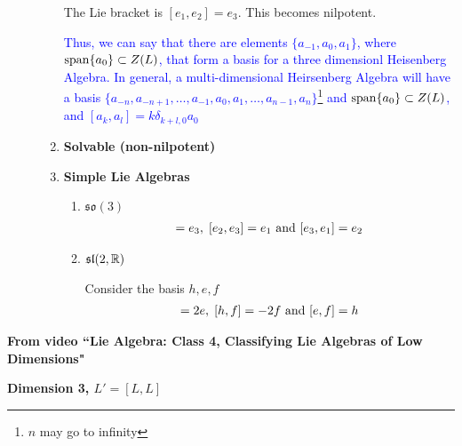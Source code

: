 \documentclass[12pt,a4paper]{report}
\newcommand{\BLUE}[1]{\textcolor{blue}{#1}}
\begin{document}
\begin{description}
\begin{enumerate}
		The Lie bracket is $[e_1, e_2] = e_3$.  This becomes nilpotent.
		
		\BLUE{Thus, we can say that there are elements $\{a_{-1}, a_0, a_1\}$, where $\operatorname{span}\{a_0\} \subset Z(L)$, that form a basis for a three dimensionl Heisenberg Algebra.  In general, a multi-dimensional Heirsenberg Algebra will have a basis $\{a_{-n},a_{-n+1}, \dots, a_{-1},a_0, a_1, \dots, a_{n-1}, a_n\}$\footnote{$n$ may go to infinity} and $\operatorname{span}\{a_0\} \subset Z(L)$, and $[a_k, a_l] = k\delta_{k+l,0}a_0$
		}
		
		\item \textbf{Solvable (non-nilpotent)}	
	
	
		\item \textbf{Simple Lie Algebras}
		
		\begin{enumerate}
			\item $\mathfrak{so}(3)$
				\begin{align*}
					[e_1, e_2] = e_3, \; [e_2, e_3] = e_1 \AND [e_3, e_1]=e_2
				\end{align*}
			\item $\mathfrak{sl}(2, \mathbb{R})$
			
			Consider the basis $h, e, f$
			\begin{align*}
				[h,e] = 2e,\;[h,f]=-2f \AND [e,f]=h
			\end{align*}
		\end{enumerate}
		
		
	\end{enumerate}
\end{description}

\HLINE
\textbf{From video ``Lie Algebra: Class 4, Classifying Lie Algebras of Low Dimensions"}

\textbf{Dimension 3, $L'=[L,L]$}
\end{document}
